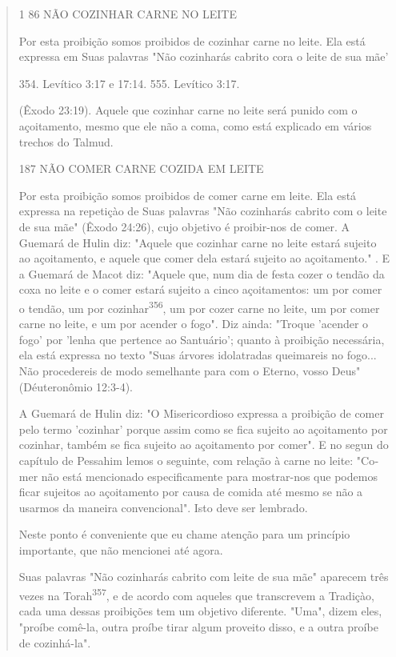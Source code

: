 \begin{quote}
1 86 NÃO COZINHAR CARNE NO LEITE

Por esta proibição somos proibidos de cozinhar carne no leite. Ela está
expressa em Suas palavras "Não cozinharás cabrito cora o leite de sua
mãe'

354. Levítico 3:17 e 17:14. 555. Levítico 3:17.

(Êxodo 23:19). Aquele que cozinhar carne no leite será punido com o
açoita­mento, mesmo que ele não a coma, como está explicado em vários
trechos do Talmud.

187 NÃO COMER CARNE COZIDA EM LEITE

Por esta proibição somos proibidos de comer carne em leite. Ela es­tá
expressa na repetiçào de Suas palavras "Não cozinharás cabrito com o
leite de sua mãe" (Êxodo 24:26), cujo objetivo é proibir-nos de comer. A
Guemará de Hulin diz: "Aquele que cozinhar carne no leite estará sujeito
ao açoitamen­to, e aquele que comer dela estará sujeito ao açoitamento."
. E a Guemará de Macot diz: "Aquele que, num dia de festa cozer o tendão
da coxa no leite e o comer estará sujeito a cinco açoitamentos: um por
comer o tendão, um por cozinhar\textsuperscript{356}, um por cozer carne
no leite, um por comer carne no leite, e um por acender o fogo". Diz
ainda: "Troque 'acender o fogo' por 'lenha que per­tence ao Santuário';
quanto à proibição necessária, ela está expressa no texto "Suas árvores
idolatradas queimareis no fogo... Não procedereis de modo se­melhante
para com o Eterno, vosso Deus" (Déuteronômio 12:3-4).

A Guemará de Hulin diz: "O Misericordioso expressa a proibição de comer
pelo termo 'cozinhar' porque assim como se fica sujeito ao açoitamento
por cozinhar, também se fica sujeito ao açoitamento por comer". E no
segun do capítulo de Pessahim lemos o seguinte, com relação à carne no
leite: "Co­mer não está mencionado especificamente para mostrar-nos que
podemos fi­car sujeitos ao açoitamento por causa de comida até mesmo se
não a usarmos da maneira convencional". Isto deve ser lembrado.

Neste ponto é conveniente que eu chame atenção para um princípio
importante, que não mencionei até agora.

Suas palavras "Não cozinharás cabrito com leite de sua mãe" apare­cem
três vezes na Torah\textsuperscript{357}, e de acordo com aqueles que
transcrevem a Tra­diçào, cada uma dessas proibições tem um objetivo
diferente. "Uma", dizem eles, "proíbe comê-la, outra proíbe tirar algum
proveito disso, e a outra proíbe de cozinhá-la".


\end{quote}
